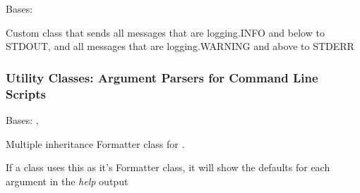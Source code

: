 \documentclass[letterpaper,10pt,english]{sphinxmanual}
\begin{document}
\begin{fulllineitems}
\label{pytan.utils:pytan.utils.SplitStreamHandler}
Bases: 

Custom  class that sends all messages that are logging.INFO and below to STDOUT, and all messages that are logging.WARNING and above to STDERR

\begin{fulllineitems}
\label{pytan.utils:pytan.utils.SplitStreamHandler.emit}
\end{fulllineitems}


\end{fulllineitems}



\subsubsection{Utility Classes: Argument Parsers for Command Line Scripts}
\label{pytan.utils:utility-classes-argument-parsers-for-command-line-scripts}

\begin{fulllineitems}
\label{pytan.utils:pytan.utils.CustomArgFormat}
Bases: \href{http://docs.python.org/2.7/library/argparse.html\#argparse.ArgumentDefaultsHelpFormatter}{}, \href{http://docs.python.org/2.7/library/argparse.html\#argparse.RawDescriptionHelpFormatter}{}

Multiple inheritance Formatter class for \href{http://docs.python.org/2.7/library/argparse.html\#argparse.ArgumentParser}{}.

If a \href{http://docs.python.org/2.7/library/argparse.html\#argparse.ArgumentParser}{} class uses this as it's Formatter class, it will show the defaults for each argument in the \emph{help} output

\end{fulllineitems}

\end{document}
